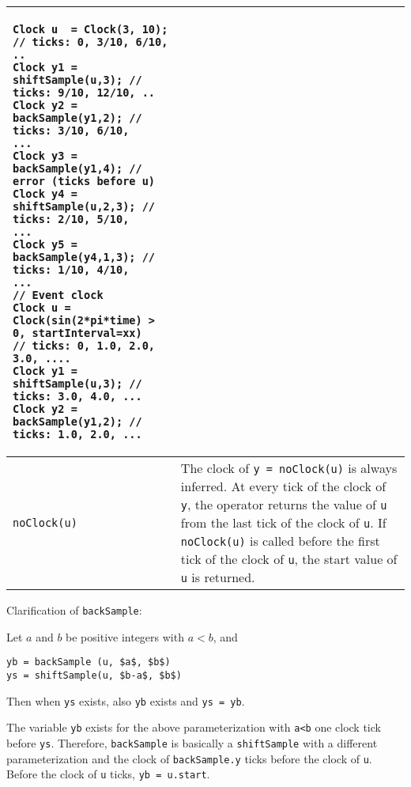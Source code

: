 \begin{longtable}[]{|p{4cm}|p{11cm}|}
\begin{example*}
\begin{lstlisting}[language=modelica]
Clock u  = Clock(3, 10); // ticks: 0, 3/10, 6/10, ..
Clock y1 = shiftSample(u,3); // ticks: 9/10, 12/10, ..
Clock y2 = backSample(y1,2); // ticks: 3/10, 6/10,
...
Clock y3 = backSample(y1,4); // error (ticks before u)
Clock y4 = shiftSample(u,2,3); // ticks: 2/10, 5/10,
...
Clock y5 = backSample(y4,1,3); // ticks: 1/10, 4/10,
...
// Event clock
Clock u = Clock(sin(2*pi*time) > 0, startInterval=xx)
// ticks: 0, 1.0, 2.0, 3.0, ....
Clock y1 = shiftSample(u,3); // ticks: 3.0, 4.0, ...
Clock y2 = backSample(y1,2); // ticks: 1.0, 2.0, ...
\end{lstlisting}
\end{example*}
\\ \hline
\lstinline!noClock(u)!
&
The clock of \lstinline!y = noClock(u)! is always inferred. At every tick
of the clock of \lstinline!y!, the operator returns the value of \lstinline!u! from the last
tick of the clock of \lstinline!u!. If \lstinline!noClock(u)! is called before the
first tick of the clock of \lstinline!u!, the start value of \lstinline!u! is returned.\\ \hline
\end{longtable}

\begin{nonnormative}
Clarification of \lstinline!backSample!:

Let $a$ and $b$ be positive integers with $a < b$, and
\begin{lstlisting}[language=modelica]
yb = backSample (u, $a$, $b$)
ys = shiftSample(u, $b-a$, $b$)
\end{lstlisting}

Then when \lstinline!ys! exists, also \lstinline!yb! exists and \lstinline!ys = yb!.

The variable \lstinline!yb! exists for the above parameterization with \lstinline!a<b! one clock tick before \lstinline!ys!.  Therefore, \lstinline!backSample! is
basically a \lstinline!shiftSample! with a different parameterization and the clock of \lstinline!backSample.y! ticks before the clock of \lstinline!u!.  Before the
clock of \lstinline!u! ticks, \lstinline!yb = u.start!.
\end{nonnormative}

